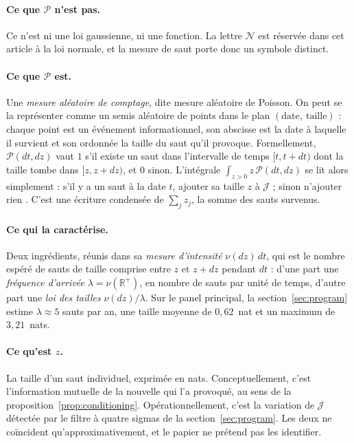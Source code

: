 \documentclass[11pt]{article}
\theoremstyle{definition}
\theoremstyle{remark}
\newcommand{\JJ}{\mathcal{J}}
\begin{document}
\paragraph{Ce que $\mathcal{P}$ n'est pas.} Ce n'est ni une loi gaussienne, ni
une fonction. La lettre $\mathcal N$ est réservée dans cet article à la loi
normale, et la mesure de saut porte donc un symbole distinct.

\paragraph{Ce que $\mathcal{P}$ est.} Une \emph{mesure aléatoire de comptage},
dite mesure aléatoire de Poisson. On peut se la représenter comme un semis
aléatoire de points dans le plan $(\text{date},\ \text{taille})$ : chaque point
est un événement informationnel, son abscisse est la date à laquelle il survient
et son ordonnée la taille du saut qu'il provoque. Formellement,
$\mathcal{P}(dt,dz)$ vaut $1$ s'il existe un saut dans l'intervalle de temps
$[t,t+dt)$ dont la taille tombe dans $[z,z+dz)$, et $0$ sinon. L'intégrale
$\int_{z>0} z\,\mathcal{P}(dt,dz)$ se lit alors simplement : \og s'il y a un
saut à la date $t$, ajouter sa taille $z$ à $\JJ$ ; sinon n'ajouter rien \fg{}.
C'est une écriture condensée de $\sum_{j} z_j$, la somme des sauts survenus.

\paragraph{Ce qui la caractérise.} Deux ingrédients, réunis dans sa
\emph{mesure d'intensité} $\nu(dz)\,dt$, qui est le nombre espéré de sauts de
taille comprise entre $z$ et $z+dz$ pendant $dt$ : d'une part une
\emph{fréquence d'arrivée} $\lambda=\nu(\mathbb{R}^+)$, en nombre de sauts par
unité de temps, d'autre part une \emph{loi des tailles} $\nu(dz)/\lambda$. Sur
le panel principal, la section~\ref{sec:program} estime $\lambda\approx5$ sauts
par an, une taille moyenne de $0{,}62$~nat et un maximum de $3{,}21$~nats.

\paragraph{Ce qu'est $z$.} La taille d'un saut individuel, exprimée en nats.
Conceptuellement, c'est l'information mutuelle de la nouvelle qui l'a provoqué,
au sens de la proposition~\ref{prop:conditioning}. Opérationnellement, c'est la
variation de $\JJ$ détectée par le filtre à quatre sigmas de la
section~\ref{sec:program}. Les deux ne coïncident qu'approximativement, et le
papier ne prétend pas les identifier.
\end{document}
